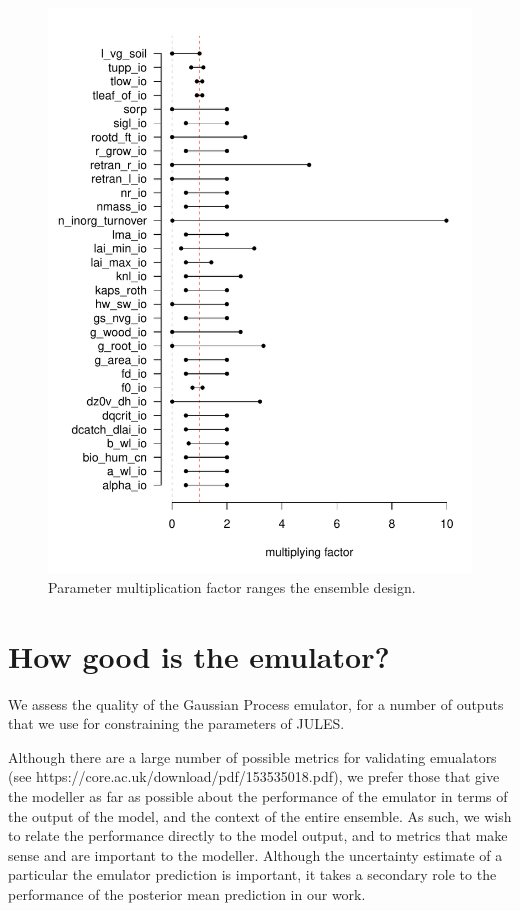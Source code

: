 \documentclass[gmd, manuscript]{copernicus}
\begin{document}
\begin{figure}[t]
\includegraphics[width=12cm]{./graphics/lhs_range.pdf}
\caption{Parameter multiplication factor ranges the ensemble design.}
\label{fig:lhs_range}
\end{figure}

\section{How good is the emulator?}    %

We assess the quality of the Gaussian Process emulator, for a number of outputs that we use for constraining the parameters of JULES.

Although there are a large number of possible metrics  for validating emualators (see https://core.ac.uk/download/pdf/153535018.pdf), we prefer those that give the modeller as far as possible about the performance of the emulator in terms of the output of the model, and the context of the entire ensemble. As such, we wish to relate the performance directly to the model output, and to metrics that make sense and are important to the modeller. Although the uncertainty estimate of a particular the emulator prediction is important, it takes a secondary role to the performance of the posterior mean prediction in our work.
\end{document}
